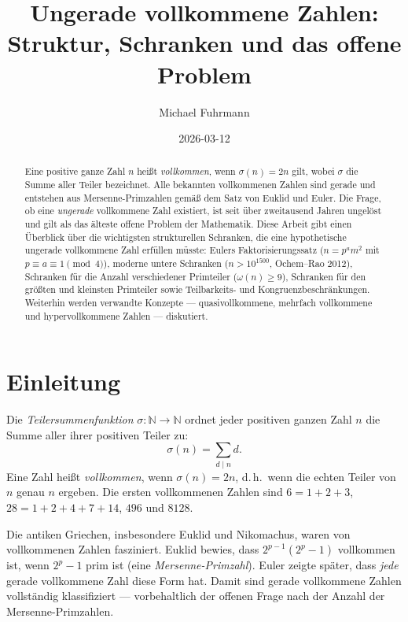 \documentclass[12pt,a4paper]{amsart}
\theoremstyle{definition}
\theoremstyle{remark}
\newcommand{\N}{\mathbb{N}}
\begin{document}
\title{Ungerade vollkommene Zahlen:\\
Struktur, Schranken und das offene Problem}

\author{Michael Fuhrmann}
\address{Specialist Mathematics Project, Build 168}
\date{2026-03-12}

\begin{abstract}
Eine positive ganze Zahl $n$ heißt \emph{vollkommen}, wenn $\sigma(n) = 2n$ gilt,
wobei $\sigma$ die Summe aller Teiler bezeichnet.
Alle bekannten vollkommenen Zahlen sind gerade und entstehen aus Mersenne-Primzahlen
gemäß dem Satz von Euklid und Euler.
Die Frage, ob eine \emph{ungerade} vollkommene Zahl existiert, ist seit über
zweitausend Jahren ungelöst und gilt als das älteste offene Problem der Mathematik.
Diese Arbeit gibt einen Überblick über die wichtigsten strukturellen Schranken,
die eine hypothetische ungerade vollkommene Zahl erfüllen müsste:
Eulers Faktorisierungssatz ($n = p^a m^2$ mit $p \equiv a \equiv 1 \pmod{4}$),
moderne untere Schranken ($n > 10^{1500}$, Ochem--Rao 2012),
Schranken für die Anzahl verschiedener Primteiler ($\omega(n) \geq 9$),
Schranken für den größten und kleinsten Primteiler sowie
Teilbarkeits- und Kongruenzbeschränkungen.
Weiterhin werden verwandte Konzepte --- quasivollkommene, mehrfach vollkommene
und hypervollkommene Zahlen --- diskutiert.
\end{abstract}

\maketitle

\tableofcontents

\section{Einleitung}

Die \emph{Teilersummenfunktion} $\sigma : \N \to \N$ ordnet jeder positiven ganzen
Zahl $n$ die Summe aller ihrer positiven Teiler zu:
\[
  \sigma(n) = \sum_{d \mid n} d.
\]
Eine Zahl heißt \emph{vollkommen}, wenn $\sigma(n) = 2n$, d.\,h.\ wenn die echten
Teiler von $n$ genau $n$ ergeben.
Die ersten vollkommenen Zahlen sind $6 = 1+2+3$, $28 = 1+2+4+7+14$,
$496$ und $8128$.

Die antiken Griechen, insbesondere Euklid und Nikomachus, waren von vollkommenen
Zahlen fasziniert.
Euklid bewies, dass $2^{p-1}(2^p-1)$ vollkommen ist, wenn $2^p - 1$ prim ist
(eine \emph{Mersenne-Primzahl}).
Euler zeigte später, dass \emph{jede} gerade vollkommene Zahl diese Form hat.
Damit sind gerade vollkommene Zahlen vollständig klassifiziert --- vorbehaltlich
der offenen Frage nach der Anzahl der Mersenne-Primzahlen.
\end{document}
